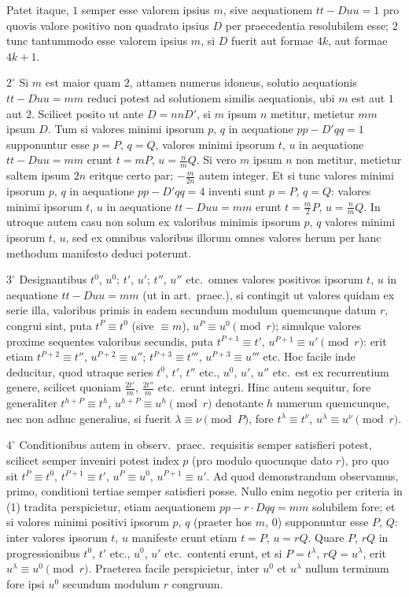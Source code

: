 \documentclass[12pt,a4paper]{article}
\theoremstyle{plain}
\theoremstyle{definition}
\theoremstyle{remark}
\begin{document}
Patet itaque, $1$ semper esse valorem ipsius $m$, sive aequationem $tt-Duu=1$ pro quovis valore positivo non quadrato ipsius $D$ per praecedentia resolubilem esse; $2$ tunc tantummodo esse valorem ipsius $m$, si $D$ fuerit aut formae $4k$, aut formae $4k+1$.

$2^\circ$ Si $m$ est maior quam $2$, attamen numerus idoneus, solutio aequationis $tt-Duu=mm$ reduci potest ad solutionem similis aequationis, ubi $m$ est aut $1$ aut $2$. Scilicet posito ut ante $D=nnD'$, si $m$ ipsum $n$ metitur, metietur $mm$ ipsum $D$. Tum si valores minimi ipsorum $p$, $q$ in aequatione $pp-D'qq=1$ supponuntur esse $p=P$, $q=Q$, valores minimi ipsorum $t$, $u$ in aequatione $tt-Duu=mm$ erunt $t=mP$, $u=\frac{n}{m}Q$. Si vero $m$ ipsum $n$ non metitur, metietur saltem ipsum $2n$ eritque certo par; $-\frac{m}{2n}$ autem integer. Et si tunc valores minimi ipsorum $p$, $q$ in aequatione $pp-D'qq=4$ inventi sunt $p=P$, $q=Q$: valores minimi ipsorum $t$, $u$ in aequatione $tt-Duu=mm$ erunt $t=\frac{m}{2}P$, $u=\frac{n}{m}Q$. In utroque autem casu non solum ex valoribus minimis ipsorum $p$, $q$ valores minimi ipsorum $t$, $u$, sed ex omnibus valoribus illorum omnes valores herum per hanc methodum manifesto deduci poterunt.

$3^\circ$ Designantibus $t^0$, $u^0$; $t'$, $u'$; $t''$, $u''$ etc.\ omnes valores positivos ipsorum $t$, $u$ in aequatione $tt-Duu=mm$ (ut in art.\ praec.), si contingit ut valores quidam ex serie illa, valoribus primis in eadem secundum modulum quemcunque datum $r$, congrui sint, puta $t^P \equiv t^0$ (sive $\equiv m$), $u^P \equiv u^0 \pmod{r}$; simulque valores proxime sequentes valoribus secundis, puta $t^{P+1} \equiv t'$, $u^{P+1} \equiv u' \pmod{r}$: erit etiam $t^{P+2} \equiv t''$, $u^{P+2} \equiv u''$; $t^{P+3} \equiv t'''$, $u^{P+3} \equiv u'''$ etc. Hoc facile inde deducitur, quod utraque series $t^0$, $t'$, $t''$ etc., $u^0$, $u'$, $u''$ etc.\ est ex recurrentium genere, scilicet quoniam $\frac{2t'}{m}$, $\frac{2t''}{m}$ etc.\ erunt integri. Hinc autem sequitur, fore generaliter $t^{h+P} \equiv t^h$, $u^{h+P} \equiv u^h \pmod{r}$ denotante $h$ numerum quemcunque, nec non adhuc generalius, si fuerit $\lambda \equiv \nu \pmod{P}$, fore $t^\lambda \equiv t^\nu$, $u^\lambda \equiv u^\nu \pmod{r}$.

$4^\circ$ Conditionibus autem in observ.\ praec.\ requisitis semper satisfieri potest, scilicet semper inveniri potest index $p$ (pro modulo quocunque dato $r$), pro quo sit $t^P \equiv t^0$, $t^{P+1} \equiv t'$, $u^P \equiv u^0$, $u^{P+1} \equiv u'$. Ad quod demonstrandum observamus, primo, conditioni tertiae semper satisfieri posse. Nullo enim negotio per criteria in (1) tradita perspicietur, etiam aequationem $pp-r\cdot Dqq=mm$ solubilem fore; et si valores minimi positivi ipsorum $p$, $q$ (praeter hos $m$, $0$) supponuntur esse $P$, $Q$: inter valores ipsorum $t$, $u$ manifeste erunt etiam $t=P$, $u=rQ$. Quare $P$, $rQ$ in progressionibus $t^0$, $t'$ etc., $u^0$, $u'$ etc.\ contenti erunt, et si $P=t^\lambda$, $rQ=u^\lambda$, erit $u^\lambda \equiv u^0 \pmod{r}$. Praeterea facile perspicietur, inter $u^0$ et $u^\lambda$ nullum terminum fore ipsi $u^0$ secundum modulum $r$ congruum.
\end{document}
